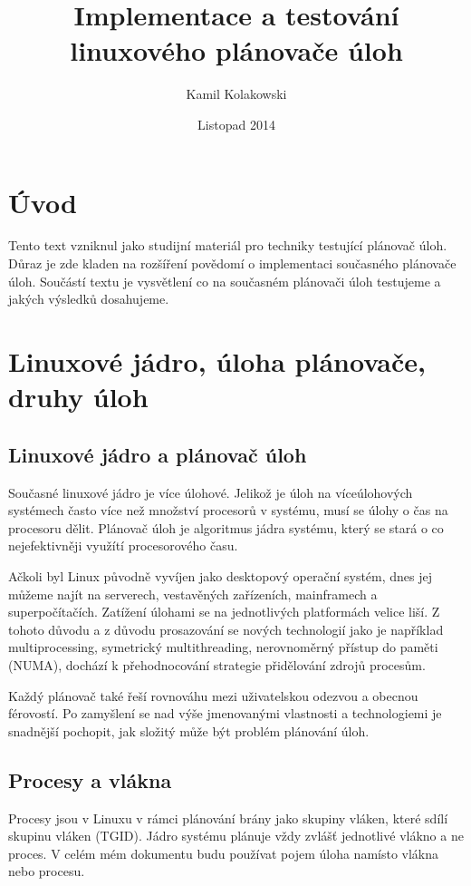 \documentclass[a4paper,12pt]{article}
\begin{document}
\title{Implementace a testování linuxového plánovače úloh}
\author{Kamil Kolakowski}
\date{Listopad 2014}
\maketitle

\section*{Úvod}
Tento text vzniknul jako studijní materiál pro techniky testující plánovač úloh. Důraz je zde kladen na rozšíření povědomí o implementaci současného plánovače úloh. Součástí textu je vysvětlení co na současném plánovači úloh testujeme a jakých výsledků dosahujeme.  

\tableofcontents
\listoffigures

\section{Linuxové jádro, úloha plánovače, druhy úloh}

\subsection{Linuxové jádro a plánovač úloh}

Současné linuxové jádro je více úlohové. Jelikož je úloh na víceúlohových systémech často více než množství procesorů v systému, musí se úlohy o čas na procesoru dělit.
Plánovač úloh je algoritmus jádra systému, který se stará o co nejefektivněji využítí procesorového času.

Ačkoli byl Linux původně vyvíjen jako desktopový operační systém, dnes jej můžeme najít na serverech, vestavěných zařízeních, mainframech a superpočítačích. Zatížení úlohami se na jednotlivých platformách velice liší. Z tohoto důvodu a z důvodu prosazování se nových technologií jako je například multiprocessing, symetrický multithreading, nerovnoměrný přístup do paměti (NUMA), dochází k přehodnocování strategie přidělování zdrojů procesům. 

Každý plánovač také řeší rovnováhu mezi uživatelskou odezvou a obecnou férovostí. Po zamyšlení se nad výše jmenovanými vlastnosti a technologiemi je snadnější pochopit, jak složitý může být problém plánování úloh.

\subsection{Procesy a vlákna}
Procesy jsou v Linuxu v rámci plánování brány jako skupiny vláken, které sdílí skupinu vláken (TGID). Jádro systému plánuje vždy zvlášť jednotlivé vlákno a ne proces. V celém mém dokumentu budu používat pojem úloha namísto vlákna nebo procesu.
\end{document}
